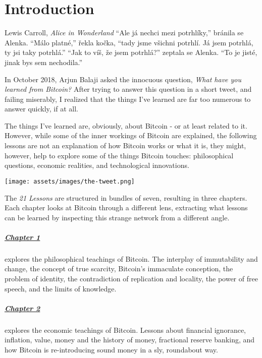 \chapter*{Introduction}
\label{ch:introduction}

\begin{chapquote}{Lewis Carroll, \textit{Alice in Wonderland}}
\enquote{Ale já nechci mezi potrhlíky,} bránila se Alenka. \enquote{Málo platné,} řekla kočka, \enquote{tady jsme všichni potrhlí. Já jsem potrhlá, ty jsi taky potrhlá.} \enquote{Jak to víš, že jsem potrhlá?} zeptala se Alenka. \enquote{To je jisté, jinak bys sem nechodila.}
\end{chapquote}

In October 2018, Arjun Balaji asked the innocuous question,
\textit{What have you learned from Bitcoin?} After trying to answer this
question in a short tweet, and failing miserably, I realized that the things
I've learned are far too numerous to answer quickly, if at all.

The things I've learned are, obviously, about Bitcoin - or at least related to
it. However, while some of the inner workings of Bitcoin are explained, the
following lessons are not an explanation of how Bitcoin works or what it is,
they might, however, help to explore some of the things Bitcoin touches:
philosophical questions, economic realities, and technological innovations.

\begin{center}
  \texttt{[image: assets/images/the-tweet.png]}
\end{center}

The \textit{21 Lessons} are structured in bundles of seven, resulting in three
chapters. Each chapter looks at Bitcoin through a different lens, extracting
what lessons can be learned by inspecting this strange network from a different
angle.

\paragraph{\hyperref[ch:philosophy]{Chapter 1}}{explores the philosophical
teachings of Bitcoin. The interplay of immutability and change, the concept of
true scarcity, Bitcoin's immaculate conception, the problem of identity, the
contradiction of replication and locality, the power of free speech, and the
limits of knowledge.
}

\paragraph{\hyperref[ch:economics]{Chapter 2}}{explores the economic teachings
of Bitcoin. Lessons about financial ignorance, inflation, value, money and the
history of money, fractional reserve banking, and how Bitcoin is re-introducing
sound money in a sly, roundabout way.}

